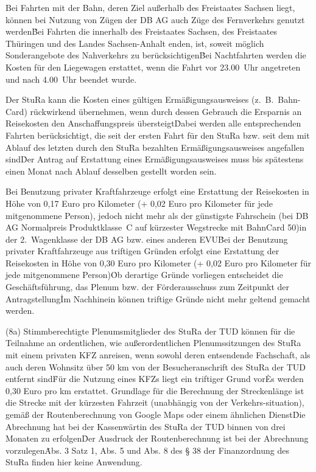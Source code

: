 \begin{multicols}{2}
\Abs \Satz Bei Fahrten mit der Bahn, deren Ziel außerhalb des Freistaates Sachsen liegt, können bei Nutzung von Zügen der DB AG auch Züge des Fernverkehrs genutzt werden\. Bei Fahrten die innerhalb des Freistaates Sachsen, des Freistaates Thüringen und des Landes Sachsen-Anhalt enden, ist, soweit möglich Sonderangebote des Nahverkehrs zu berücksichtigen\. Bei Nachtfahrten werden die Kosten für den Liegewagen erstattet, wenn die Fahrt vor 23.00~Uhr angetreten und nach 4.00~Uhr beendet wurde.

\Abs \Satz Der StuRa kann die Kosten eines gültigen Ermäßigungsausweises (z.~B.~Bahn-Card) rückwirkend übernehmen, wenn durch dessen Gebrauch die Ersparnis an Reisekosten den Anschaffungspreis übersteigt\. Dabei werden alle entsprechenden Fahrten berücksichtigt, die seit der ersten Fahrt für den StuRa bzw. seit dem mit Ablauf des letzten durch den StuRa bezahlten Ermäßigungsausweises angefallen sind\. Der Antrag auf Erstattung eines Ermäßigungsausweises muss bis spätestens einen Monat nach Ablauf desselben gestellt worden sein.

\Abs \Satz Bei  Benutzung  privater   Kraftfahrzeuge  erfolgt  eine  Erstattung  der Reisekosten in Höhe von 0,17 Euro pro Kilometer (+ 0,02 Euro pro Kilometer für jede mitgenommene Person), jedoch nicht  mehr  als  der  günstigste Fahrschein (bei DB AG Normalpreis Produktklasse~C auf kürzester Wegstrecke mit BahnCard 50)in der 2.~Wagenklasse der DB AG bzw. eines anderen EVU\. Bei der Benutzung privater Kraftfahrzeuge aus triftigen Gründen erfolgt eine Erstattung der Reisekosten in Höhe von 0,30 Euro pro Kilometer (+ 0,02 Euro pro Kilometer für jede mitgenommene Person)\. Ob derartige Gründe vorliegen entscheidet die Geschäftsführung, das Plenum bzw. der Förderausschuss zum Zeitpunkt der Antragstellung\. Im Nachhinein können triftige Gründe nicht mehr geltend gemacht werden. \
 
(8a) \Satz Stimmberechtigte Plenumsmitglieder des StuRa der TUD können für die Teilnahme an ordentlichen, wie außerordentlichen Plenumssitzungen des StuRa mit einem privaten KFZ anreisen, wenn sowohl deren entsendende Fachschaft, als auch deren Wohnsitz über 50 km von der Besucheranschrift des StuRa der TUD entfernt sind\. Für die Nutzung eines KFZs liegt ein triftiger Grund vor\. Es werden 0,30 Euro pro km erstattet. Grundlage für die Berechnung der Streckenlänge ist die Strecke mit der kürzesten Fahrzeit (unabhängig von der Verkehrs-situation), gemäß der Routenberechnung von Google Maps oder einem ähnlichen Dienst\. Die Abrechnung hat bei der Kassenwärtin des StuRa der TUD binnen von drei Monaten zu erfolgen\. Der Ausdruck der Routenberechnung ist bei der Abrechnung vorzulegen\. Abs. 3 Satz 1, Abs. 5 und Abs. 8 des § 38 der Finanzordnung des StuRa finden hier keine Anwendung.


\end{multicols}
